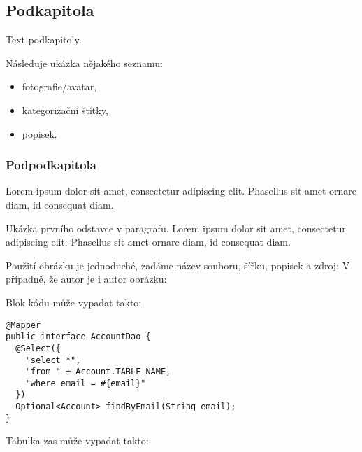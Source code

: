 	\subsection{Podkapitola}

	Text podkapitoly.

	Následuje ukázka nějakého seznamu:
	\begin{itemize}
		\item fotografie/avatar,
		\item kategorizační štítky,
		\item popisek.
	\end{itemize}

		\subsubsection{Podpodkapitola}

		Lorem ipsum dolor sit amet, consectetur adipiscing elit. Phasellus sit amet ornare diam, id consequat diam.


			\noindent Ukázka prvního odstavce v paragrafu. Lorem ipsum dolor sit amet, consectetur adipiscing elit. Phasellus sit amet ornare diam, id consequat diam.



			Použití obrázku je jednoduché, zadáme název souboru, šířku, popisek a zdroj:
			V případně, že autor je i autor obrázku:


			Blok kódu může vypadat takto:

			\begin{codeblock}
				\begin{verbatim}
@Mapper
public interface AccountDao {
  @Select({
    "select *",
    "from " + Account.TABLE_NAME,
    "where email = #{email}"
  })
  Optional<Account> findByEmail(String email);
}
				\end{verbatim}
			\end{codeblock}

			Tabulka zas může vypadat takto:

